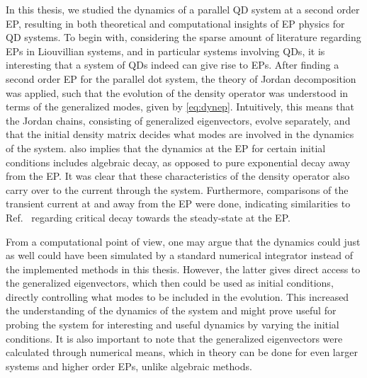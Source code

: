 \documentclass[../main.tex]{subfiles}
\begin{document}
In this thesis, we studied the dynamics of a parallel QD system at a second order EP, resulting in both theoretical and computational insights of EP physics for QD systems. To begin with, considering the sparse amount of literature regarding EPs in Liouvillian systems, and in particular systems involving QDs, it is interesting that a system of QDs indeed can give rise to EPs. After finding a second order EP for the parallel dot system, the theory of Jordan decomposition was applied, such that the evolution of the density operator was understood in terms of the generalized modes, given by \cref{eq:dynep}. Intuitively, this means that the Jordan chains, consisting of generalized eigenvectors, evolve separately, and that the initial density matrix decides what modes are involved in the dynamics of the system.  also implies that the dynamics at the EP for certain initial conditions includes algebraic decay, as opposed to pure exponential decay away from the EP. It was clear that these characteristics of the density operator also carry over to the current through the system. Furthermore, comparisons of the transient current at and away from the EP were done, indicating similarities to Ref.~\cite{thermal} regarding critical decay towards the steady-state at the EP.

From a computational point of view, one may argue that the dynamics could just as well could have been simulated by a standard numerical integrator instead of the implemented methods in this thesis. However, the latter gives direct access to the generalized eigenvectors, which then could be used as initial conditions, directly controlling what modes to be included in the evolution. This increased the understanding of the dynamics of the system and might prove useful for probing the system for interesting and useful dynamics by varying the initial conditions. It is also important to note that the generalized eigenvectors were calculated through numerical means, which in theory can be done for even larger systems and higher order EPs, unlike algebraic methods. %
\end{document}
